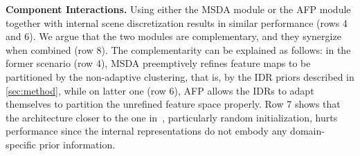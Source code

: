 \noindent{}\textbf{Component Interactions.} Using either the MSDA module or the AFP module together with internal scene discretization results in similar performance (rows 4 and 6). We argue that the two modules are complementary, and they synergize when combined (row 8). The complementarity can be explained as follows: in the former scenario (row 4), MSDA preemptively refines feature maps to be partitioned by the non-adaptive clustering, that is, by the IDR priors described in \cref{sec:method}, while on latter one (row 6), AFP allows the IDRs to adapt themselves to partition the unrefined feature space properly. Row 7 shows that the architecture closer to the one in~\cite{Locatello2020}, particularly random initialization, hurts performance since the internal representations do not embody any domain-specific prior information.

\begin{table}[]
    \centering
    \caption{\textbf{Ablation of \ourmodel.} EDD: Explicit Depth Discretization \cite{Fu2018, Bhat2020}, ISD: Internal Scene discretization, AFP: Adaptive Feature Partitioning, MSDA: MultiScale Deformable Attention. The EDD module, used in SotA methods, and our ISD module are mutually exclusive. AFP with (\cmark) refers to random initialization of IDRs and architecture similar to~\cite{Locatello2020}. The last row corresponds to our complete \ourmodel model.}
    \vspace{-10pt}
    \label{tab:ablations}
    \vspace{-10pt}
\end{table}
